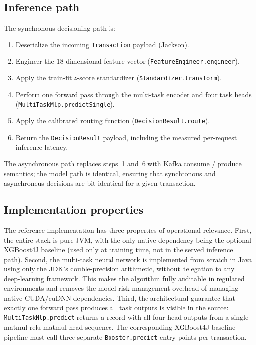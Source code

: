 \documentclass[11pt,a4paper]{article}
\begin{document}
\subsection{Inference path}
The synchronous decisioning path is:

\begin{enumerate}
    \item Deserialize the incoming \texttt{Transaction} payload (Jackson).
    \item Engineer the 18-dimensional feature vector
    (\texttt{FeatureEngineer.engineer}).
    \item Apply the train-fit $z$-score standardizer
    (\texttt{Standardizer.transform}).
    \item Perform one forward pass through the multi-task encoder and
    four task heads (\texttt{MultiTaskMlp.predictSingle}).
    \item Apply the calibrated routing function
    (\texttt{DecisionResult.route}).
    \item Return the \texttt{DecisionResult} payload, including the
    measured per-request inference latency.
\end{enumerate}

The asynchronous path replaces steps~1 and~6 with Kafka consume / produce
semantics; the model path is identical, ensuring that synchronous and
asynchronous decisions are bit-identical for a given transaction.

\subsection{Implementation properties}
The reference implementation has three properties of operational
relevance. First, the entire stack is pure JVM, with the only native
dependency being the optional XGBoost4J baseline (used only at training
time, not in the served inference path). Second, the multi-task neural
network is implemented from scratch in Java using only the JDK's
double-precision arithmetic, without delegation to any deep-learning
framework. This makes the algorithm fully auditable in regulated
environments and removes the model-risk-management overhead of
managing native CUDA/cuDNN dependencies. Third, the architectural
guarantee that exactly one forward pass produces all task outputs is
visible in the source: \texttt{MultiTaskMlp.predict} returns a record
with all four head outputs from a single matmul-relu-matmul-head
sequence. The corresponding XGBoost4J baseline pipeline must call
three separate \texttt{Booster.predict} entry points per transaction.
\end{document}
